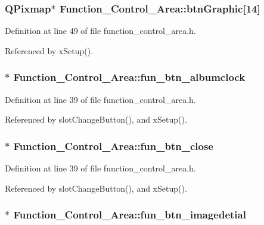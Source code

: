 \subsubsection{\setlength{\rightskip}{0pt plus 5cm}QPixmap$\ast$ {\bf Function\_\-Control\_\-Area::btn\-Graphic}[14]\hspace{0.3cm}{\tt  [private]}}\label{classFunction__Control__Area_Function__Control__Arear0}




Definition at line 49 of file function\_\-control\_\-area.h.

Referenced by x\-Setup().
\subsubsection{ $\ast$ {\bf Function\_\-Control\_\-Area::fun\_\-btn\_\-albumclock}}\label{classFunction__Control__Area_Function__Control__Areao3}




Definition at line 39 of file function\_\-control\_\-area.h.

Referenced by slot\-Change\-Button(), and x\-Setup().
\subsubsection{ $\ast$ {\bf Function\_\-Control\_\-Area::fun\_\-btn\_\-close}}\label{classFunction__Control__Area_Function__Control__Areao5}




Definition at line 39 of file function\_\-control\_\-area.h.

Referenced by slot\-Change\-Button(), and x\-Setup().
\subsubsection{ $\ast$ {\bf Function\_\-Control\_\-Area::fun\_\-btn\_\-imagedetial}}\label{classFunction__Control__Area_Function__Control__Areao6}




